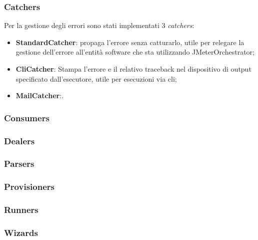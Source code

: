 \subsubsection{Catchers}
Per la gestione degli errori sono stati implementati 3 \textit{catchers}:
\begin{itemize}
	\item \textbf{StandardCatcher}: propaga l'errore senza catturarlo, utile per relegare la gestione dell'errore all'entità software che sta utilizzando JMeterOrchestrator;
	\item \textbf{CliCatcher}: Stampa l'errore e il relativo \gls{traceback} nel dispositivo di output specificato dall'esecutore, utile per esecuzioni via \gls{cli};
	\item \textbf{MailCatcher}:.
\end{itemize}
\subsubsection{Consumers}
\subsubsection{Dealers}
\subsubsection{Parsers}
\subsubsection{Provisioners}
\subsubsection{Runners}
\subsubsection{Wizards}